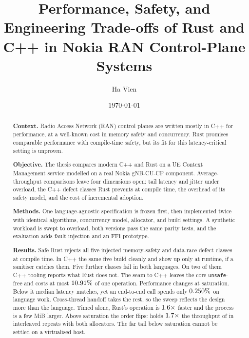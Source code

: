 \documentclass[english,twoside,openright,a4paper,censored,csm,software-track-2020]{HYthesisML}
\title{Performance, Safety, and Engineering Trade-offs of Rust and C++ in Nokia RAN Control-Plane Systems}
\author{Ha Vien}
\date{\today}
\begin{document}
\maketitle


{\singlespacing
\begin{otherlanguage}{english}
\begin{abstract}
\noindent\textbf{Context.}
Radio Access Network (RAN) control planes are written mostly in C++ for performance, at a
well-known cost in memory safety and concurrency. Rust promises comparable performance with
compile-time safety, but its fit for this latency-critical setting is unproven.

\noindent\textbf{Objective.}
The thesis compares modern C++ and Rust on a UE Context Management service modelled on a real
Nokia gNB-CU-CP component. Average-throughput comparisons leave four dimensions open: tail latency
and jitter under overload, the C++ defect classes Rust prevents at compile time, the overhead of
its safety model, and the cost of incremental adoption.

\noindent\textbf{Methods.}
One language-agnostic specification is frozen first, then implemented twice with identical
algorithms, concurrency model, allocator, and build settings. A synthetic workload is swept to
overload, both versions pass the same parity tests, and the evaluation adds fault injection and an
FFI prototype.

\noindent\textbf{Results.}
Safe Rust rejects all five injected memory-safety and data-race defect classes at compile
time. In C++ the same five build cleanly and show up only at runtime, if a sanitiser catches
them. Five further classes fail in both languages. On two of them C++ tooling reports what
Rust does not. The seam to C++ leaves the core \texttt{unsafe}-free and costs at most
$10.91\%$ of one operation. Performance changes at saturation. Below it median
latency matches, yet an end-to-end call spends only $0.250\%$ on language
work. Cross-thread handoff takes the rest, so the sweep reflects the design more than the
language. Timed alone, Rust's operation is $1.6\times$ faster and the process
is a few MiB larger. Above saturation the order flips: \OverloadSustainedFaster{} holds
$1.7\times$ the throughput of \OverloadSustainedSlower{} in \OverloadThrAgree{}
interleaved repeats with both allocators. The far tail below saturation cannot be settled
on a virtualised host.


\end{abstract}
\end{otherlanguage}}
\end{document}
